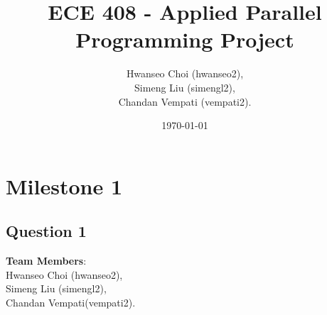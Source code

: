 \documentclass[12pt,titlepage]{article}
\title{ECE 408 - Applied Parallel Programming Project}
\date{\today}
\author{
	Hwanseo Choi (hwanseo2), \\
	Simeng Liu (simengl2),\\
	Chandan Vempati (vempati2).
}
\begin{document}
\maketitle

\section*{Milestone 1}

\subsection*{Question 1}
\textbf{Team Members}: \\
	Hwanseo Choi (hwanseo2),\\
	Simeng Liu (simengl2),\\
	Chandan Vempati(vempati2).\\
\end{document}
